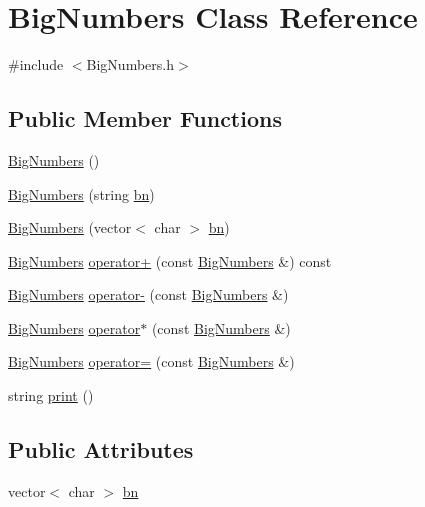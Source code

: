 \hypertarget{class_big_numbers}{}\section{Big\+Numbers Class Reference}
\label{class_big_numbers}


{\ttfamily \#include $<$Big\+Numbers.\+h$>$}

\subsection*{Public Member Functions}
\begin{DoxyCompactItemize}
\item 
\mbox{\hyperlink{class_big_numbers_af3dd82883f10f3473ac83280f26b0ad8}{Big\+Numbers}} ()
\item 
\mbox{\hyperlink{class_big_numbers_a99d3e27e38581f94c7c72a907ce83a98}{Big\+Numbers}} (string \mbox{\hyperlink{class_big_numbers_a9c43bc93a372c7c7d9f1eca2f3a5ae9c}{bn}})
\item 
\mbox{\hyperlink{class_big_numbers_a472b5513193db24f582dc3ea5288f1a6}{Big\+Numbers}} (vector$<$ char $>$ \mbox{\hyperlink{class_big_numbers_a9c43bc93a372c7c7d9f1eca2f3a5ae9c}{bn}})
\item 
\mbox{\hyperlink{class_big_numbers}{Big\+Numbers}} \mbox{\hyperlink{class_big_numbers_af666111eecd76c5f808243954b5213d4}{operator+}} (const \mbox{\hyperlink{class_big_numbers}{Big\+Numbers}} \&) const
\item 
\mbox{\hyperlink{class_big_numbers}{Big\+Numbers}} \mbox{\hyperlink{class_big_numbers_ac8b9a03b6c074439aaa29417b743189b}{operator-\/}} (const \mbox{\hyperlink{class_big_numbers}{Big\+Numbers}} \&)
\item 
\mbox{\hyperlink{class_big_numbers}{Big\+Numbers}} \mbox{\hyperlink{class_big_numbers_ab4a10f12b8f3712f4a5d71f5290bc0f9}{operator$\ast$}} (const \mbox{\hyperlink{class_big_numbers}{Big\+Numbers}} \&)
\item 
\mbox{\hyperlink{class_big_numbers}{Big\+Numbers}} \mbox{\hyperlink{class_big_numbers_a1ff55cbf60eddfeedae51198d3a2cf7d}{operator=}} (const \mbox{\hyperlink{class_big_numbers}{Big\+Numbers}} \&)
\item 
string \mbox{\hyperlink{class_big_numbers_a1d72103bab34ba4c14095a5e069d1d36}{print}} ()
\end{DoxyCompactItemize}
\subsection*{Public Attributes}
\begin{DoxyCompactItemize}
\item 
vector$<$ char $>$ \mbox{\hyperlink{class_big_numbers_a9c43bc93a372c7c7d9f1eca2f3a5ae9c}{bn}}
\end{DoxyCompactItemize}


